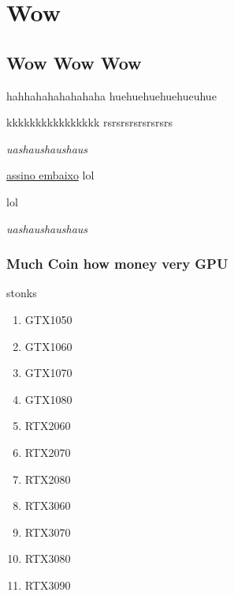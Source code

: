 \documentclass[12pt]{book}
\begin{document}
 

\chapter{Wow}

\section{Wow Wow Wow}

hahhahahahahahaha
huehuehuehuehueuhue

kkkkkkkkkkkkkkkk
rsrsrsrsrsrsrsrs

\textit{uashaushaushaus}

\underline{assino embaixo}
lol
\par
lol

\textit{uashaushaushaus}

\subsection{Much Coin how money very GPU}

stonks

\begin{enumerate} 
\item GTX1050
\item GTX1060
\item GTX1070
\item GTX1080
\item RTX2060
\item RTX2070
\item RTX2080
\item RTX3060
\item RTX3070
\item RTX3080
\item RTX3090
\end{enumerate}
\end{document}
